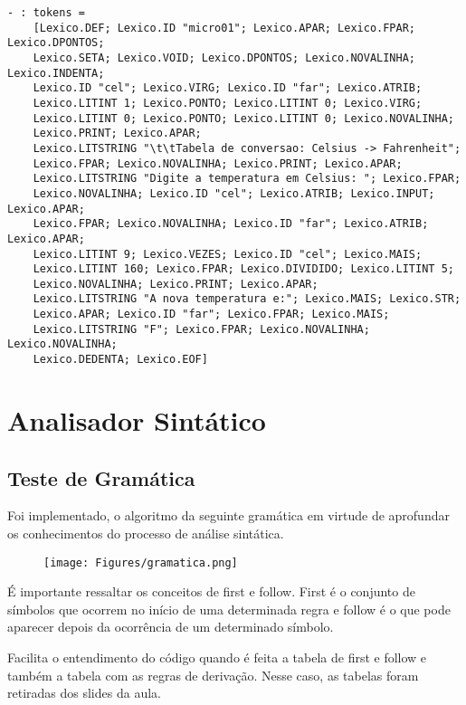 \documentclass[hidelinks,12pt]{article}
\begin{document}
	\begin{lstlisting}[caption=Analisador Léxico com Comentário]
	- : tokens =
	[Lexico.DEF; Lexico.ID "micro01"; Lexico.APAR; Lexico.FPAR; Lexico.DPONTOS;
	Lexico.SETA; Lexico.VOID; Lexico.DPONTOS; Lexico.NOVALINHA; Lexico.INDENTA;
	Lexico.ID "cel"; Lexico.VIRG; Lexico.ID "far"; Lexico.ATRIB;
	Lexico.LITINT 1; Lexico.PONTO; Lexico.LITINT 0; Lexico.VIRG;
	Lexico.LITINT 0; Lexico.PONTO; Lexico.LITINT 0; Lexico.NOVALINHA;
	Lexico.PRINT; Lexico.APAR;
	Lexico.LITSTRING "\t\tTabela de conversao: Celsius -> Fahrenheit";
	Lexico.FPAR; Lexico.NOVALINHA; Lexico.PRINT; Lexico.APAR;
	Lexico.LITSTRING "Digite a temperatura em Celsius: "; Lexico.FPAR;
	Lexico.NOVALINHA; Lexico.ID "cel"; Lexico.ATRIB; Lexico.INPUT; Lexico.APAR;
	Lexico.FPAR; Lexico.NOVALINHA; Lexico.ID "far"; Lexico.ATRIB; Lexico.APAR;
	Lexico.LITINT 9; Lexico.VEZES; Lexico.ID "cel"; Lexico.MAIS;
	Lexico.LITINT 160; Lexico.FPAR; Lexico.DIVIDIDO; Lexico.LITINT 5;
	Lexico.NOVALINHA; Lexico.PRINT; Lexico.APAR;
	Lexico.LITSTRING "A nova temperatura e:"; Lexico.MAIS; Lexico.STR;
	Lexico.APAR; Lexico.ID "far"; Lexico.FPAR; Lexico.MAIS;
	Lexico.LITSTRING "F"; Lexico.FPAR; Lexico.NOVALINHA; Lexico.NOVALINHA;
	Lexico.DEDENTA; Lexico.EOF]
	\end{lstlisting}
	
\section{Analisador Sintático}

\subsection{Teste de Gramática}

	Foi implementado, o algoritmo da seguinte gramática em virtude de aprofundar os conhecimentos do processo de análise sintática.
	
	\begin{figure}[h!]
		\centering
		\texttt{[image: Figures/gramatica.png]}
	\end{figure}	
	
	\newpage
	É importante ressaltar os conceitos de first e follow. First é o conjunto de símbolos que ocorrem no início de uma determinada regra  e follow é o que pode aparecer depois da ocorrência de um determinado símbolo.
	
	Facilita o entendimento do código quando é feita a tabela de first e follow e também a tabela com as regras de derivação. Nesse caso, as tabelas foram retiradas dos slides da aula.
	
\end{document}
